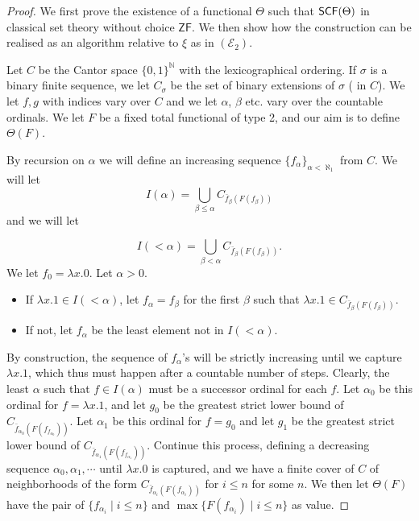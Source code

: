 \documentclass[reqno]{amsart}
\def\N{{\mathbb  N}}
\def\E{{\mathcal  E}}
\def\SCF{\textup{\textsf{SCF}}}
\numberwithin{equation}{section}
\numberwithin{thm}{section}
\begin{document}
\begin{proof}
We first prove the existence of a functional $\Theta$ such that $\SCF(\Theta)$ in classical set theory without choice $\textsf{ZF}$.  
We then show how the construction can be realised as an algorithm relative to $\xi$ as in $(\E_{2})$.   %
 
 Let $C$ be the Cantor space $\{0,1\}^\N$  with the lexicographical ordering. If $\sigma$ is a binary finite sequence, we let $C_\sigma$ be the set of binary extensions of $\sigma$ (
 in $C$).
 \newline
 We let $f,g$ with indices vary over $C$ and we let $\alpha$, $\beta$ etc. vary over the countable ordinals. We let $F$ be a fixed total functional of type 2, and our aim is to define $\Theta(F)$.
 
 By recursion on $\alpha$ we will define an increasing sequence $\{f_\alpha\}_{\alpha < \aleph_1}$ from $C$.
 We will let $$I(\alpha) = \bigcup_{\beta \leq \alpha}C_{\bar f_\beta(F(f_\beta))}$$ and we will let 
 
$$I(< \alpha) = \bigcup_{\beta < \alpha}C_{\bar f_\beta(F(f_\beta))}.$$
We let $f_0 = \lambda x.0$.
%
\newline Let $\alpha > 0$. 
\begin{itemize}
\item If $\lambda x.1 \in I( < \alpha)$, let $f_\alpha = f_\beta$ for the first $\beta$ such that $\lambda x.1 \in C_{\bar f_\beta(F(f_\beta))}$.
\item If not, let $f_\alpha$ be the least element not in $I(< \alpha)$.
\end{itemize}
By construction, the sequence of $f_\alpha$'s will be strictly increasing until we capture $\lambda x.1$, which thus must happen after a countable number of steps.
\vspace{2mm}
 \newline
 Clearly, the least $\alpha$ such that $f \in I(\alpha)$ must be a successor ordinal for each $f$. Let $\alpha_0$ be this ordinal for $f = \lambda x.1$, and let $g_0$ be the greatest strict lower bound of $C_{\bar f_{\alpha_0}(F(f_{f_{\alpha_0}}))}.$
 \newline
 Let $\alpha_1$ be this ordinal for $f = g_0$ and let $g_1$ be the greatest strict lower bound of $C_{\bar f_{\alpha_1}(F(f_{f_{\alpha_1}}))}.$
 \newline
 Continue this process, defining a decreasing sequence $\alpha_0,\alpha_1, \cdots$  until $\lambda x.0$ is captured, and we have a finite cover of $C$ of neighborhoods of the form $C_{\bar f_{\alpha_i}(F(f_{\alpha_i}))}$ for $i \leq n$  for some $n$.
 \newline
 We then let $\Theta(F)$ have the pair of $\{f_{\alpha_i}\mid i  \leq n\}$ and $\max\{F(f_{\alpha_i})\mid i \leq n\}$ as value.
 

\end{proof}
\end{document}
